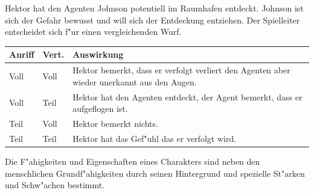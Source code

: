 \begin{ruleexample}
    Hektor hat den Agenten Johnson potentiell im Raumhafen entdeckt. Johnson ist sich der Gefahr bewusst und will sich der Entdeckung entziehen. Der Spielleiter entscheidet sich f"ur einen vergleichenden Wurf.

    \begin{center}\begin{tabular}{m{1.2cm} m{1.2cm} m{11cm}}
        \textbf{Anriff} & \textbf{Vert.} & \textbf{Auswirkung} \\\hline
        Voll & Voll & Hektor bemerkt, dass er verfolgt verliert den Agenten aber wieder unerkannt aus den Augen.  \\
        Voll & Teil & Hektor hat den Agenten entdeckt, der Agent bemerkt, dass er aufgeflogen ist.\\
        Teil & Voll & Hektor bemerkt nichts. \\
        Teil & Teil & Hektor hat das Gef"uhl das er verfolgt wird. \\
    \end{tabular}\end{center}
\end{ruleexample}


Die F"ahigkeiten und Eigenschaften eines Charakters sind neben den menschlichen Grundf"ahigkeiten durch seinen Hintergrund und spezielle St"arken und Schw"achen bestimmt. 

